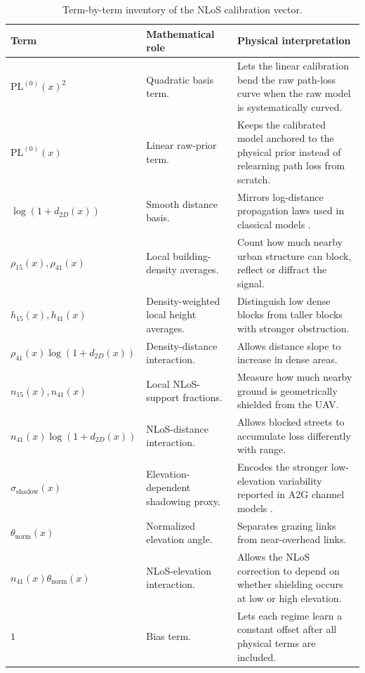 \begin{table}[H]
\centering
\small
\begin{tabularx}{\textwidth}{p{3.1cm} X X}
\toprule
\textbf{Term} & \textbf{Mathematical role} & \textbf{Physical interpretation} \\
\midrule
\(\mathrm{PL}^{(0)}(x)^2\) & Quadratic basis term. & Lets the linear calibration bend the raw path-loss curve when the raw model is systematically curved. \\
\(\mathrm{PL}^{(0)}(x)\) & Linear raw-prior term. & Keeps the calibrated model anchored to the physical prior instead of relearning path loss from scratch. \\
\(\log(1+d_{2D}(x))\) & Smooth distance basis. & Mirrors log-distance propagation laws used in classical models \cite{rappaport,cost231}. \\
\(\rho_{15}(x),\rho_{41}(x)\) & Local building-density averages. & Count how much nearby urban structure can block, reflect or diffract the signal. \\
\(h_{15}(x),h_{41}(x)\) & Density-weighted local height averages. & Distinguish low dense blocks from taller blocks with stronger obstruction. \\
\(\rho_{41}(x)\log(1+d_{2D}(x))\) & Density-distance interaction. & Allows distance slope to increase in dense areas. \\
\(n_{15}(x),n_{41}(x)\) & Local NLoS-support fractions. & Measure how much nearby ground is geometrically shielded from the UAV. \\
\(n_{41}(x)\log(1+d_{2D}(x))\) & NLoS-distance interaction. & Allows blocked streets to accumulate loss differently with range. \\
\(\sigma_{\mathrm{shadow}}(x)\) & Elevation-dependent shadowing proxy. & Encodes the stronger low-elevation variability reported in A2G channel models \cite{khawaja_survey,tr38901}. \\
\(\theta_{\mathrm{norm}}(x)\) & Normalized elevation angle. & Separates grazing links from near-overhead links. \\
\(n_{41}(x)\theta_{\mathrm{norm}}(x)\) & NLoS-elevation interaction. & Allows the NLoS correction to depend on whether shielding occurs at low or high elevation. \\
\(1\) & Bias term. & Lets each regime learn a constant offset after all physical terms are included. \\
\bottomrule
\end{tabularx}
\caption{Term-by-term inventory of the NLoS calibration
vector.}
\label{tab:x78_term_inventory}
\end{table}

